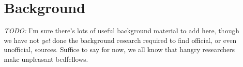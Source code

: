 \section{Background}

\emph{TODO:} I'm sure there's lots of useful background material to add here, though we have not \emph{yet} done the background research required to find official, or even unofficial, sources.
Suffice to say for now, we all know that hangry researchers make unpleasant bedfellows.
